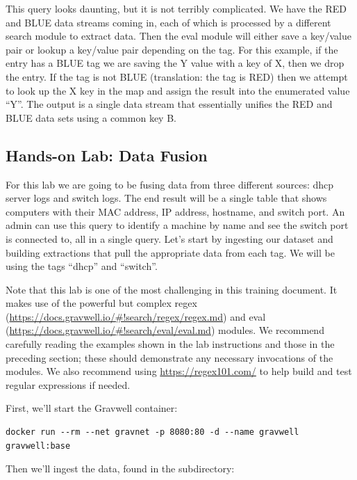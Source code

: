 This query looks daunting, but it is not terribly complicated. We have
the RED and BLUE data streams coming in, each of which is processed by a
different search module to extract data. Then the eval module will
either save a key/value pair or lookup a key/value pair depending on the
tag. For this example, if the entry has a BLUE tag we are saving the Y
value with a key of X, then we drop the entry. If the tag is not
BLUE (translation: the tag is RED) then we attempt to look up the X key in the map and assign
the result into the enumerated value ``Y''. The output is a single data stream
that essentially unifies the RED and BLUE data sets using a common key
B.

\clearpage
\subsection{Hands-on Lab: Data Fusion}

For this lab we are going to be fusing data from three different
sources: dhcp server logs and switch logs. The end result will be a
single table that shows computers with their MAC address, IP address,
hostname, and switch port. An admin can use this query to identify a
machine by name and see the switch port is connected to, all in a single
query. Let's start by ingesting our dataset and building extractions
that pull the appropriate data from each tag. We will be using the
tags ``dhcp'' and ``switch''.

Note that this lab is one of the most challenging in this training document. It makes use of the powerful but complex regex (\href{https://docs.gravwell.io/\#!search/regex/regex.md}{https://docs.gravwell.io/\#!search/regex/regex.md}) and eval (\href{https://docs.gravwell.io/\#!search/eval/eval.md}{https://docs.gravwell.io/\#!search/eval/eval.md}) modules. We recommend carefully reading the examples shown in the lab instructions and those in the preceding section; these should demonstrate any necessary invocations of the modules. We also recommend using \href{https://regex101.com/}{https://regex101.com/} to help build and test regular expressions if needed.

First, we'll start the Gravwell container:

\begin{Verbatim}[breaklines=true]
docker run --rm --net gravnet -p 8080:80 -d --name gravwell gravwell:base
\end{Verbatim}

Then we'll ingest the data, found in the  subdirectory:

